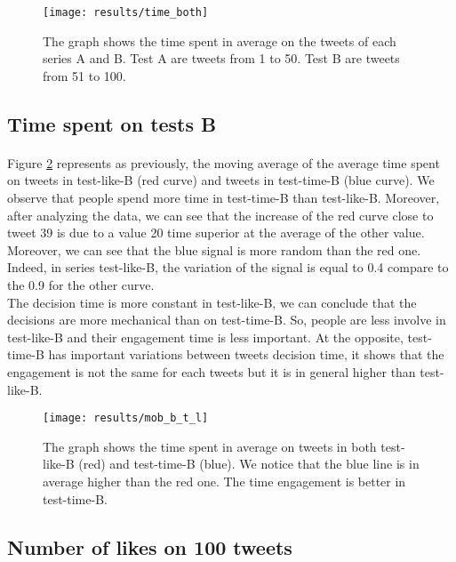 \begin{figure}[h] 
\centering 
\texttt{[image: results/time\_both]} 
\caption[Average time on the 100 tweets]{The graph shows the time spent in average on the tweets of each series A and B. Test A are tweets from 1 to 50. Test B are tweets from 51 to 100.}
\label{fig:time_both} 
\end{figure}


\subsection{Time spent on tests B}

\paragraph{}
Figure \ref{fig:mob_b_t_l} represents as previously, the moving average of the average time spent on tweets in test-like-B (red curve) and tweets in test-time-B (blue curve). We observe that people spend more time in test-time-B than test-like-B. Moreover, after analyzing the data, we can see that the increase of the red curve close to tweet 39 is due to a value 20 time superior at the average of the other value.
Moreover, we can see that the blue signal is more random than the red one. Indeed, in series test-like-B, the variation of the signal is equal to 0.4 compare to the 0.9 for the other curve.\\
The decision time is more constant in test-like-B, we can conclude that the decisions are more mechanical than on test-time-B. So,  people are less involve in test-like-B and their engagement time is less important. At the opposite, test-time-B has important variations between tweets decision time, it shows that the engagement is not the same for each tweets but it is in general higher than test-like-B.

\begin{figure}[h] 
\centering 
\texttt{[image: results/mob\_b\_t\_l]} 
\caption[Time engagement in tests B]{The graph shows the time spent in average on tweets in both test-like-B (red) and test-time-B (blue). We notice that the blue line is in average higher than the red one. The time engagement is better in test-time-B.}
\label{fig:mob_b_t_l} 
\end{figure}


\subsection{Number of likes on 100 tweets}

